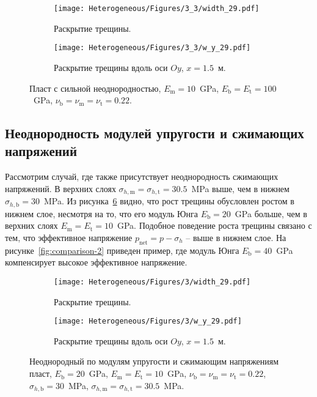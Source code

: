 \begin{figure}[htbp]
    \centering
    \begin{subfigure}[t]{0.4\textwidth}
        \centering
        \texttt{[image: Heterogeneous/Figures/3\_3/width\_29.pdf]}
        \caption{Раскрытие трещины.}
        \label{fig:heterogeneous-3layer-planar}
    \end{subfigure}
    \hfill 
    \begin{subfigure}[t]{0.55\textwidth}
        \centering
        \texttt{[image: Heterogeneous/Figures/3\_3/w\_y\_29.pdf]}
        \caption{Раскрытие трещины вдоль оси $Oy$, $x=1.5$~м.}
        \label{fig:heterogeneous-3layer-slice}
    \end{subfigure}
    \caption{Пласт с сильной неоднородностью, $E_\text{m} = 10$~GPa, $E_\text{b} = E_\text{t} = 100$~GPa, $\nu_\text{b} = \nu_\text{m} = \nu_\text{t} = 0.22$.}
    \label{fig:heterogeneous-3layer}
\end{figure}



\subsection{Неоднородность модулей упругости и сжимающих напряжений}
Рассмотрим случай, где также присутствует неоднородность сжимающих напряжений. В верхних слоях $\sigma_{h,\text{m}} = \sigma_{h,\text{t}} = 30.5$~MPa выше, чем в нижнем $\sigma_{h,\text{b}} = 30$~MPa. Из рисунка~\ref{fig:comparison-1} видно, что рост трещины обусловлен ростом в нижнем слое, несмотря на то, что его модуль Юнга $E_\text{b} = 20$~GPa больше, чем в верхних слоях $E_\text{m} = E_\text{t} = 10$~GPa. Подобное поведение роста трещины связано с тем, что эффективное напряжение $p_\text{net} = p - \sigma_h$ -- выше в нижнем слое. На рисунке~\ref{fig:comparison-2} приведен пример, где модуль Юнга $E_\text{b} = 40$~GPa компенсирует высокое эффективное напряжение.

\begin{figure}[htbp]
    \centering
    \begin{subfigure}[t]{0.4\textwidth}
        \centering
        \texttt{[image: Heterogeneous/Figures/3/width\_29.pdf]}
        \caption{Раскрытие трещины.}
        \label{fig:comparison-1-planar}
    \end{subfigure}
    \hfill 
    \begin{subfigure}[t]{0.55\textwidth}
        \centering
        \texttt{[image: Heterogeneous/Figures/3/w\_y\_29.pdf]}
        \caption{Раскрытие трещины вдоль оси $Oy$, $x=1.5$~м.}
        \label{fig:comparison-1-slice}
    \end{subfigure}
    \caption{Неоднородный по модулям упругости и сжимающим напряжениям пласт, $E_\text{b} = 20$~GPa, $E_\text{m} = E_\text{t} = 10$~GPa, $\nu_\text{b} = \nu_\text{m} = \nu_\text{t} = 0.22$, $\sigma_{h,\text{b}} = 30$~MPa, $\sigma_{h,\text{m}} = \sigma_{h,\text{t}} = 30.5$~MPa.}
    \label{fig:comparison-1}
\end{figure}


